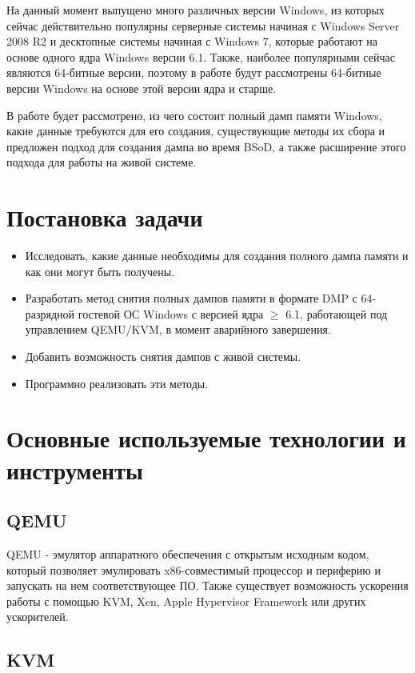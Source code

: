 \documentclass{mipt-thesis-bs}
\begin{document}
На данный момент выпущено много различных версии Windows, из которых сейчас действительно популярны серверные системы начиная с Windows Server 2008 R2 и десктопные системы начиная с Windows 7, которые работают на основе одного ядра Windows версии 6.1. Также, наиболее популярными сейчас являются 64-битные версии, поэтому в работе будут рассмотрены 64-битные версии Windows на основе этой версии ядра и старше.

В работе будет рассмотрено, из чего состоит полный дамп памяти Windows, какие данные требуются для его создания, существующие методы их сбора и предложен подход для создания дампа во время BSoD, а также расширение этого подхода для работы на живой системе.

\chapter{Постановка задачи}

\begin{itemize}
\item Исследовать, какие данные необходимы для создания полного дампа памяти и как они могут быть получены.
\item Разработать метод снятия полных дампов памяти в формате DMP с 64-разрядной гостевой ОС Windows с версией ядра $\geqslant$ 6.1, работающей под управлением QEMU/KVM, в момент аварийного завершения.
\item Добавить возможность снятия дампов с живой системы.
\item Программно реализовать эти методы.
\end{itemize}

\chapter{Основные используемые технологии и инструменты}

\section*{QEMU}

QEMU - эмулятор аппаратного обеспечения с открытым исходным кодом, который позволяет эмулировать x86-совместимый процессор и периферию и запускать на нем соответствующее ПО. Также существует возможность ускорения работы с помощью KVM, Xen, Apple Hypervisor Framework или других ускорителей.

\section*{KVM}
\end{document}
